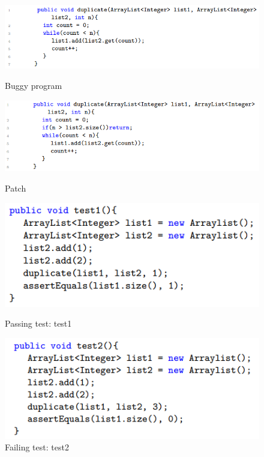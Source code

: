 \documentclass[sn-basic]{sn-jnl}
\theoremstyle{thmstyleone}
\theoremstyle{thmstyletwo}
\theoremstyle{thmstylethree}
\begin{document}
\begin{figure}[htbp]
	\centering
	\begin{minipage}[t]{1\textwidth}
		\centering
		\includegraphics[width=1\textwidth]{fig1.png}
		\caption{Buggy program}\label{fig1}
		\vspace{5mm}
	\end{minipage}

    \begin{minipage}[t]{1\textwidth}
	\centering
	\includegraphics[width=1\textwidth]{fig2.png}
	\caption{Patch}\label{fig2}
	\vspace{5mm}
    \end{minipage}

	\begin{minipage}[t]{0.5\textwidth}
		\centering
		\includegraphics[width=1\textwidth]{fig3.png}
		\caption{Passing test: test1}\label{fig3}
	\end{minipage}
	\begin{minipage}[t]{0.48\textwidth}
		\centering
		\includegraphics[width=1\textwidth]{fig4.png}
		\caption{Failing test: test2}\label{fig4}
	\end{minipage}
\end{figure}
\end{document}
